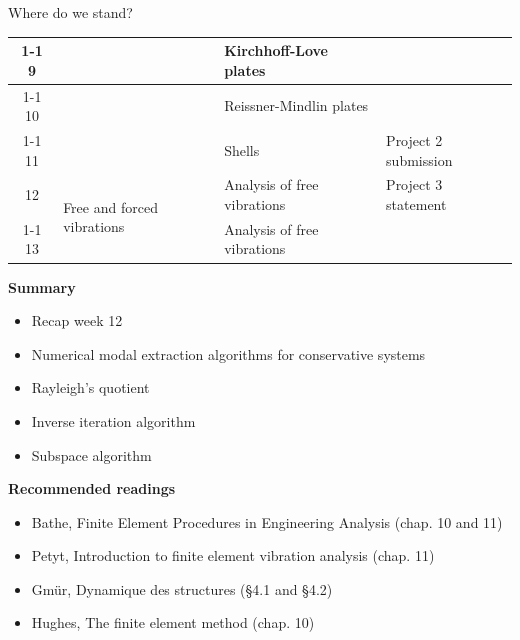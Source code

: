 \documentclass[aspectratio=169]{beamer}
\begin{document}
{\begin{frame}{Where do we stand?}
\begin{center}
\begin{tabular}{|c|l|l|l|}
        \cline{1-1} \cline{3-4} 9          &                                                & Kirchhoff-Love plates              &                        \\
        \cline{1-1} \cline{3-4}
        10                                 &                                                & Reissner-Mindlin plates            &                        \\
        \cline{1-1} \cline{3-4}
        11                                 &                                                & Shells                             & Project 2 submission   \\
        \hline
        12                                 & \multirow{2}{7em}{Free and forced vibrations}  & Analysis of free vibrations        & Project 3 statement    \\
        \cline{1-1} \cline{3-4} 13         &                                                & Analysis of free vibrations        &                        \\
        \hline
      \end{tabular}
    \end{center}
    \vspace{1cm}
  \end{frame}

  \begin{frame}
    \textbf{\large Summary}
    \begin{itemize}
      \item Recap week 12
      \item Numerical modal extraction algorithms for conservative systems
      \item Rayleigh's quotient
      \item Inverse iteration algorithm
      \item Subspace algorithm
    \end{itemize}
    \vspace{.5cm}

    \textbf{\large Recommended readings}
    \begin{itemize}
      \item[(B)] Bathe, Finite Element Procedures in Engineering Analysis (chap. 10 and 11)
      \item[(P)] Petyt, Introduction to finite element vibration analysis (chap. 11)
      \item[(G)] Gmür, Dynamique des structures (§4.1 and §4.2)
      \item[(H)] Hughes, The finite element method (chap. 10)
    \end{itemize}
  \end{frame}
}
\end{document}
